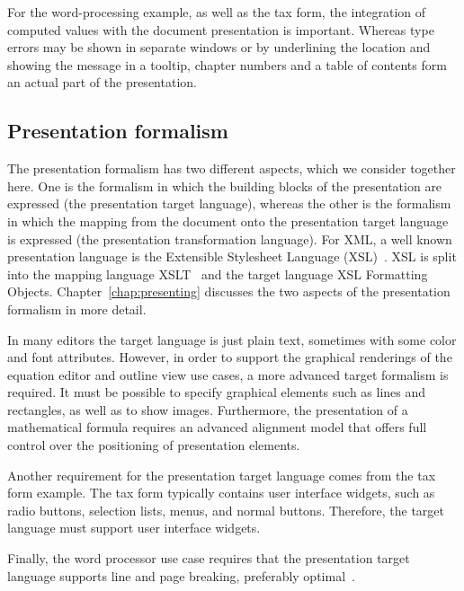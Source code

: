 For the word-processing example, as well as the tax form, the integration of computed values with the document presentation is important. Whereas type errors may be shown in separate windows or by underlining the location and showing the message in a tooltip, chapter numbers and a table of contents form an actual part of the presentation. 


%																
\subsection{Presentation formalism}

The presentation formalism has two different aspects, which we consider together here. One is the formalism in which the building blocks of the presentation are expressed (the presentation target language), whereas the other is the formalism in which the mapping from the document onto the presentation target language is expressed (the presentation transformation language). For XML, a well known presentation language is the Extensible Stylesheet Language (XSL)~\cite{xsl10}. XSL is split into the mapping language XSLT~\cite{xslt10} and the target language XSL Formatting Objects. Chapter~\ref{chap:presenting} discusses the two aspects of the presentation formalism in more detail.

In many editors the target language is just plain text, sometimes with some color and font attributes. However, in order to support the graphical renderings of the equation editor and outline view use cases, a more advanced target formalism is required. It must be possible to specify graphical elements such as lines and rectangles, as well as to show images. Furthermore, the presentation of a mathematical formula requires an advanced alignment model that offers full control over the positioning of presentation elements.

Another requirement for the presentation target language comes from the tax form example. The tax form typically contains user interface widgets, such as radio buttons, selection lists, menus, and normal buttons. Therefore, the target language must support user interface widgets.


Finally, the word processor use case requires that the presentation target language supports line and page breaking, preferably optimal~\cite{knuth82breaking}. 

